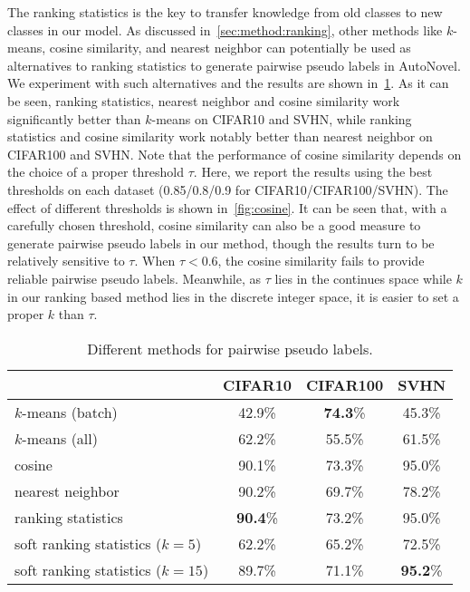 The ranking statistics is the key to transfer knowledge from old classes to new classes in our model.
As discussed in~\cref{sec:method:ranking}, other methods like $k$-means, cosine similarity, and nearest neighbor can potentially be used as alternatives to ranking statistics to generate pairwise pseudo labels in AutoNovel.
We experiment with such alternatives and the results are shown in~\cref{tab:diff_pairwise}.
As it can be seen, ranking statistics, nearest neighbor and cosine similarity work significantly better than $k$-means on CIFAR10 and SVHN, while ranking statistics and cosine similarity work notably better than nearest neighbor on CIFAR100 and SVHN.
Note that the performance of cosine similarity depends on the choice of a proper threshold $\tau$.
Here, we report the results using the best thresholds on each dataset (0.85/0.8/0.9 for CIFAR10/CIFAR100/SVHN).
The effect of different thresholds is shown in~\cref{fig:cosine}.
It can be seen that, with a carefully chosen threshold, cosine similarity can also be a good measure to generate pairwise pseudo labels in our method, though the results turn to be relatively sensitive to $\tau$.
When $\tau < 0.6$, the cosine similarity fails to provide reliable pairwise pseudo labels.
Meanwhile, as $\tau$ lies in the continues space while $k$ in our ranking based method lies in the discrete integer space, it is easier to set a proper $k$ than $\tau$.

\begin{table}[h!]
\centering
\footnotesize
\caption{Different methods for pairwise pseudo labels.}\label{tab:diff_pairwise}
\begin{tabular}{lccc}
\toprule{}
& CIFAR10 & CIFAR100 & SVHN  \\
\midrule
$k$-means (batch) &42.9\%  &\textbf{74.3}\% &45.3\% \\
$k$-means (all) &62.2\%  &55.5\% &61.5\% \\
cosine & 90.1\% &73.3\% & 95.0\% \\
nearest neighbor & 90.2\% &69.7\% & 78.2\% \\
ranking statistics & \textbf{90.4}\%  &73.2\% & 95.0\% \\
\midrule
soft ranking statistics ($k=5$) & 62.2\%  &65.2\% & 72.5\% \\
soft ranking statistics ($k=15$)& 89.7\%  &71.1\% & \textbf{95.2}\% \\
\bottomrule
\end{tabular}
\end{table}

